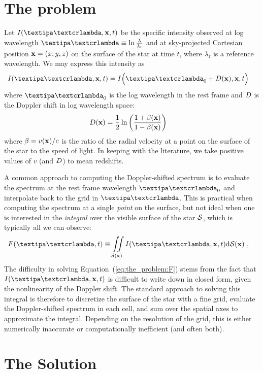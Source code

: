 \documentclass[modern]{aastex631}
\begin{document}
\section{The problem}
\label{sec:the_problem}
%
Let $I(\lnlam, \x, t)$ be the specific intensity observed at log wavelength $\lnlam \equiv \ln\frac{\lambda}{\lambda_\mathrm{r}}$ and at sky-projected Cartesian position ${\mathbf{x}} = (x, y, z)$ on the surface of the star at time $t$, where $\lambda_\mathrm{r}$ is a reference wavelength.
We may express this intensity as
%
\begin{align}
    \label{eq:the_problem:Ixi}
    I(\lnlam, \x, t) & =
    I\Big(\lnlam_0 + \D(\x), \x, t\Big)
\end{align}
%
where $\lnlam_0$ is the log wavelength in the rest frame and $D$ is the Doppler shift in log wavelength space:
%
\begin{align}
    \label{eq:the_problem:D}
    D({\mathbf{x}})
     & =
    \frac{1}{2}\ln\left(
    \frac{1 + \beta({\mathbf{x}})}{1 - \beta({\mathbf{x}})}
    \right)
\end{align}
%
where $\beta = v({\mathbf{x}}) / c$ is the ratio of the radial velocity at a point on the surface of the star to the speed of light.
In keeping with the literature, we take positive values of $v$ (and $D$) to mean redshifts.

A common approach to computing the Doppler-shifted spectrum is to evaluate the spectrum at the rest frame wavelength $\lnlam_0$ and interpolate back to the grid in $\lnlam$. 
This is practical when computing the spectrum at a single \emph{point} on the surface, but not ideal when one is interested in the \emph{integral} over the visible surface of the star $\mathcal{S}$, which is typically all we can observe:
%
\begin{align}
    \label{eq:the_problem:F}
    F(\lnlam, t)
     & \equiv
    \iint\limits_{\Surf(\x)}
    I(\lnlam, \x, t)
    \mathrm{d}{\Surf(\x)}
    \quad,
\end{align}
%
The difficulty in solving Equation~(\ref{eq:the_problem:F}) stems from the fact that $I(\lnlam, \x, t)$ is difficult to write down in closed form, given the nonlinearity of the Doppler shift.
The standard approach to solving this integral is therefore to discretize the surface of the star with a fine grid, evaluate the Doppler-shifted spectrum in each cell, and sum over the spatial axes to approximate the integral. 
Depending on the resolution of the grid, this is either numerically inaccurate or computationally inefficient (and often both).

\section{The Solution}
\label{sec:the_solution}
\end{document}
